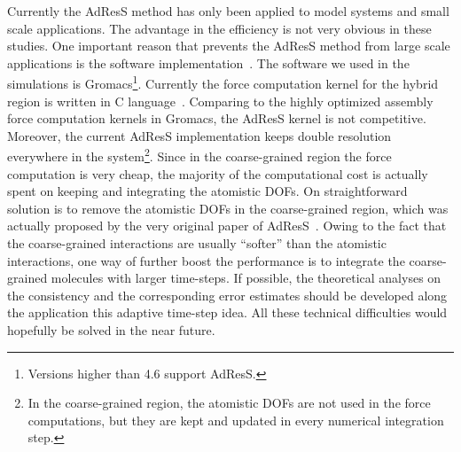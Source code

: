 \documentclass[epjST]{svjour}
\begin{document}

Currently the AdResS method has only been applied to model systems and small scale
applications. The advantage in the efficiency is not very obvious in these studies.
One important reason that prevents the AdResS method from
large scale applications is the software implementation~\cite{agarwal2014chemical}.
The software we used in the simulations is Gromacs\footnote{Versions higher than 4.6 support
AdResS.}.
Currently the force computation kernel for the hybrid region is written in C language~\cite{kernighan1988c}.
Comparing to the highly optimized assembly force computation kernels in Gromacs,
the AdResS kernel is not competitive. Moreover, the current AdResS implementation
keeps double resolution everywhere in the system\footnote{In the coarse-grained region,
  the atomistic DOFs are not used in the force computations, but they are kept and updated
  in every numerical integration step.
}.
Since in the coarse-grained region the force computation is very cheap, the majority
of the computational cost is actually spent on keeping and integrating the atomistic DOFs.
On straightforward solution is to remove the atomistic DOFs in the coarse-grained
region, which was actually proposed by the very original paper of AdResS~\cite{praprotnik2005adaptive}.
Owing to the fact that the coarse-grained interactions are usually ``softer''
than the atomistic interactions, one way of further boost the performance is
to integrate the coarse-grained molecules with larger time-steps.
If possible, the theoretical analyses on the
consistency and the corresponding
error estimates should be developed along the application this adaptive time-step idea.
All these technical difficulties would hopefully be solved in the near future.




{}


\end{document}
